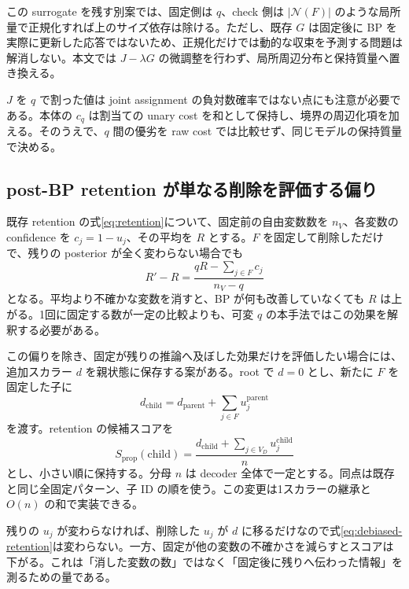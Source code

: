 \documentclass[a4paper,11pt]{ltjsarticle}
\numberwithin{equation}{section}
\theoremstyle{definition}
\newcommand{\N}{\mathcal N}
\begin{document}
この surrogate を残す別案では、固定側は $q$、check 側は $|\N(F)|$ のような局所量で正規化すれば上のサイズ依存は除ける。ただし、既存 $G$ は固定後に BP を実際に更新した応答ではないため、正規化だけでは動的な収束を予測する問題は解消しない。本文では $J-\lambda G$ の微調整を行わず、局所周辺分布と保持質量へ置き換える。

$J$ を $q$ で割った値は joint assignment の負対数確率ではない点にも注意が必要である。本体の $c_q$ は割当ての unary cost を和として保持し、境界の周辺化項を加える。そのうえで、$q$ 間の優劣を raw cost では比較せず、同じモデルの保持質量で決める。

\subsection{post-BP retention が単なる削除を評価する偏り}
既存 retention の式\eqref{eq:retention}について、固定前の自由変数数を $n_V$、各変数の confidence を $c_j=1-u_j$、その平均を $R$ とする。$F$ を固定して削除しただけで、残りの posterior が全く変わらない場合でも
\begin{equation}
 R'-R=\frac{qR-\sum_{j\in F}c_j}{n_V-q}
 \label{eq:retention-bias}
\end{equation}
となる。平均より不確かな変数を消すと、BP が何も改善していなくても $R$ は上がる。1回に固定する数が一定の比較よりも、可変 $q$ の本手法ではこの効果を解釈する必要がある。

この偏りを除き、固定が残りの推論へ及ぼした効果だけを評価したい場合には、追加スカラー $d$ を親状態に保存する案がある。root で $d=0$ とし、新たに $F$ を固定した子に
\begin{equation}
 d_{\mathrm{child}}=d_{\mathrm{parent}}+
                    \sum_{j\in F}u_j^{\mathrm{parent}}
 \label{eq:debt}
\end{equation}
を渡す。retention の候補スコアを
\begin{equation}
 S_{\mathrm{prop}}(\mathrm{child})=
 \frac{d_{\mathrm{child}}+
         \sum_{j\in V_D}u_j^{\mathrm{child}}}{n}
 \label{eq:debiased-retention}
\end{equation}
とし、小さい順に保持する。分母 $n$ は decoder 全体で一定とする。同点は既存と同じ全固定パターン、子 ID の順を使う。この変更は1スカラーの継承と $O(n)$ の和で実装できる。

残りの $u_j$ が変わらなければ、削除した $u_j$ が $d$ に移るだけなので式\eqref{eq:debiased-retention}は変わらない。一方、固定が他の変数の不確かさを減らすとスコアは下がる。これは「消した変数の数」ではなく「固定後に残りへ伝わった情報」を測るための量である。
\end{document}
